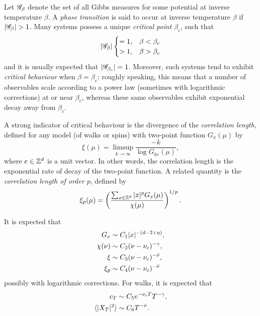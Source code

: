 Let $\mathscr{G}_\beta$ denote the set of all Gibbs measures for some potential at inverse temperature $\beta$. A \emph{phase transition} is said to occur at inverse temperature $\beta$ if $|\mathscr{G}_\beta| > 1$. Many systems possess a unique \emph{critical point} $\beta_c$, such that
\begin{equation}
|\mathscr{G}_\beta|
\begin{cases}
=1,  & \beta < \beta_c \\
> 1, & \beta > \beta_c
\end{cases}
\end{equation}
and it is usually expected that $|\mathscr{G}_{\beta_c}| = 1$. Moreover, such systems tend to exhibit \emph{critical behaviour} when $\beta = \beta_c$:
roughly speaking, this means that a number of observables scale according to a power law (sometimes with logarithmic corrections) at or near $\beta_c$, whereas these same observables exhibit exponential decay away from $\beta_c$.

A strong indicator of critical behaviour is the divergence of the
\emph{correlation length}, defined for any model (of walks or spins) with two-point function $G_x(\mu)$ by
\begin{equation}
\xi(\mu) = \limsup_{k\to\infty} \frac{-k}{\log G_{ke}(\mu)},
\end{equation}
where $e \in { {{\mathbb Z}}^d }$ is a unit vector. In other words, the correlation length is the exponential rate of decay of the two-point function.
A related quantity is the \emph{correlation length of order $p$}, defined by
\begin{equation}
\xi_p(\mu) = \left(\frac{\sum_{x\in{ {{\mathbb Z}}^d }} |x|^p G_x(\mu)}{\chi(\mu)}\right)^{1/p}.
\end{equation}

It is expected that
\begin{align}
G_x       &\sim C_1 |x|^{-(d - 2 + \eta)}, \\
\chi(\nu) &\sim C_2 (\nu - \nu_c)^{-\gamma}, \\
\xi       &\sim C_3 (\nu - \nu_c)^{-\bar\nu}, \\
\xi_p     &\sim C_4 (\nu - \nu_c)^{-\bar\nu}
\end{align}
possibly with logarithmic corrections. For walks, it is expected that
\begin{align}
c_T                       &\sim C_5 e^{-\nu_c T} T^{-\gamma}, \\
\langle |X_T|^2 \rangle   &\sim C_6 T^{-\bar\nu}.
\end{align}

